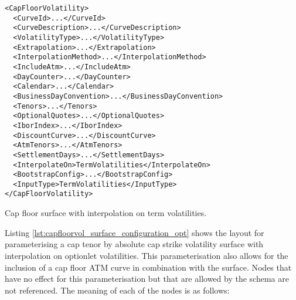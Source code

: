\begin{longlisting}
\begin{verbatim}
<CapFloorVolatility>
  <CurveId>...</CurveId>
  <CurveDescription>...</CurveDescription>
  <VolatilityType>...</VolatilityType>
  <Extrapolation>...</Extrapolation>
  <InterpolationMethod>...</InterpolationMethod>
  <IncludeAtm>...</IncludeAtm>
  <DayCounter>...</DayCounter>
  <Calendar>...</Calendar>
  <BusinessDayConvention>...</BusinessDayConvention>
  <Tenors>...</Tenors>
  <OptionalQuotes>...</OptionalQuotes>
  <IborIndex>...</IborIndex>
  <DiscountCurve>...</DiscountCurve>
  <AtmTenors>...</AtmTenors>
  <SettlementDays>...</SettlementDays>
  <InterpolateOn>TermVolatilities</InterpolateOn>
  <BootstrapConfig>...</BootstrapConfig>
  <InputType>TermVolatilities</InputType>
</CapFloorVolatility>
\end{verbatim}
\caption{Cap floor surface with interpolation on term volatilities.}
\label{lst:capfloorvol_surface_configuration_term}
\end{longlisting}

Listing \ref{lst:capfloorvol_surface_configuration_opt} shows the layout for parameterising a cap tenor by absolute cap strike volatility surface with interpolation on optionlet volatilities. This parameterisation also allows for the inclusion of a cap floor ATM curve in combination with the surface. Nodes that have no effect for this parameterisation but that are allowed by the schema are not referenced. The meaning of each of the nodes is as follows:

